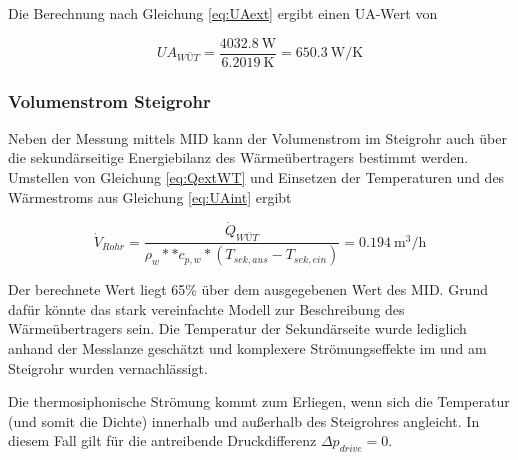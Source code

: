 Die Berechnung nach Gleichung \ref{eq:UAext} ergibt einen UA-Wert von

\begin{equation}
	\label{eq:UAint}
	UA_{WÜT} = \frac{\SI{4032,8}{\watt}}{\SI{6.2019}{\kelvin}} = \SI{650,3}{\watt\per\kelvin}
\end{equation}

\subsubsection{Volumenstrom Steigrohr}
Neben der Messung mittels MID kann der Volumenstrom im Steigrohr auch über die sekundärseitige Energiebilanz des Wärmeübertragers bestimmt werden. Umstellen von Gleichung \ref{eq:QextWT} und Einsetzen der Temperaturen und des Wärmestroms aus Gleichung \ref{eq:UAint} ergibt

\begin{equation}
	\label{eq:Vdot}
	\dot V_{Rohr}  =\frac{\dot Q_{WÜT}}{\rho_{w} *  * c_{p,w} * (T_{sek,aus}-T_{sek,ein})}  = \SI{0,194}{\cubic\meter\per\hour}
\end{equation}

Der berechnete Wert liegt 65\% über dem ausgegebenen Wert des MID. Grund dafür könnte das stark vereinfachte Modell zur Beschreibung des Wärmeübertragers sein. Die Temperatur der Sekundärseite wurde lediglich anhand der Messlanze geschätzt und komplexere Strömungseffekte im und am Steigrohr wurden vernachlässigt.


Die thermosiphonische Strömung kommt zum Erliegen, wenn sich die Temperatur (und somit die Dichte) innerhalb und außerhalb des Steigrohres angleicht. In diesem Fall gilt für die antreibende Druckdifferenz $\Delta p_{drive}=0$.  


